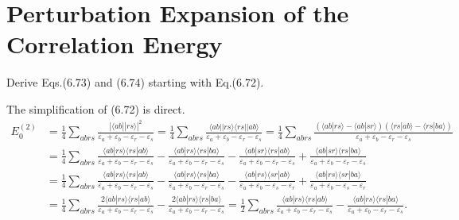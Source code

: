 \documentclass[a4paper]{book}
\newcounter{exercise}[chapter]
\newcounter{solution}[chapter]
\begin{document}
	\section{Perturbation Expansion of the Correlation Energy}
	
	\begin{exercise}
	Derive Eqs.(6.73) and (6.74) starting with Eq.(6.72).
	\end{exercise}
	
	\begin{solution}
	The simplification of (6.72) is direct.	
	\begin{align*}
		E^{(2)}_0 &= \frac{1}{4} \sum_{abrs} \frac{ | \langle ab || rs \rangle |^2 }{ \varepsilon_a + \varepsilon_b - \varepsilon_r - \varepsilon_s } = \frac{1}{4} \sum_{abrs} \frac{ \langle ab || rs \rangle \langle rs || ab \rangle }{ \varepsilon_a + \varepsilon_b - \varepsilon_r - \varepsilon_s } = \frac{1}{4} \sum_{abrs} \frac{ ( \langle ab | rs \rangle - \langle ab | sr \rangle ) ( \langle rs | ab \rangle - \langle rs | ba \rangle )  }{ \varepsilon_a + \varepsilon_b - \varepsilon_r - \varepsilon_s } \\
		&= \frac{1}{4} \sum_{abrs} \frac{ \langle ab | rs \rangle \langle rs | ab \rangle  }{ \varepsilon_a + \varepsilon_b - \varepsilon_r - \varepsilon_s } - \frac{ \langle ab | rs \rangle\langle rs | ba \rangle }{ \varepsilon_a + \varepsilon_b - \varepsilon_r - \varepsilon_s } - \frac{ \langle ab | sr \rangle \langle rs | ab \rangle }{ \varepsilon_a + \varepsilon_b - \varepsilon_r - \varepsilon_s } + \frac{ \langle ab | sr \rangle \langle rs | ba \rangle }{ \varepsilon_a + \varepsilon_b - \varepsilon_r - \varepsilon_s } \\
		&= \frac{1}{4} \sum_{abrs} \frac{ \langle ab | rs \rangle \langle rs | ab \rangle  }{ \varepsilon_a + \varepsilon_b - \varepsilon_r - \varepsilon_s } - \frac{ \langle ab | rs \rangle\langle rs | ba \rangle }{ \varepsilon_a + \varepsilon_b - \varepsilon_r - \varepsilon_s } - \frac{ \langle ab | rs \rangle \langle sr | ab \rangle }{ \varepsilon_a + \varepsilon_b - \varepsilon_s - \varepsilon_r } + \frac{ \langle ab | rs \rangle \langle sr | ba \rangle }{ \varepsilon_a + \varepsilon_b - \varepsilon_s - \varepsilon_r } \\
		&= \frac{1}{4} \sum_{abrs} \frac{ 2 \langle ab | rs \rangle \langle rs | ab \rangle  }{ \varepsilon_a + \varepsilon_b - \varepsilon_r - \varepsilon_s } - \frac{ 2 \langle ab | rs \rangle\langle rs | ba \rangle }{ \varepsilon_a + \varepsilon_b - \varepsilon_r - \varepsilon_s } = \frac{1}{2} \sum_{abrs} \frac{ \langle ab | rs \rangle \langle rs | ab \rangle  }{ \varepsilon_a + \varepsilon_b - \varepsilon_r - \varepsilon_s } - \frac{ \langle ab | rs \rangle\langle rs | ba \rangle }{ \varepsilon_a + \varepsilon_b - \varepsilon_r - \varepsilon_s } .
	\end{align*}
	

\end{solution}
\end{document}
